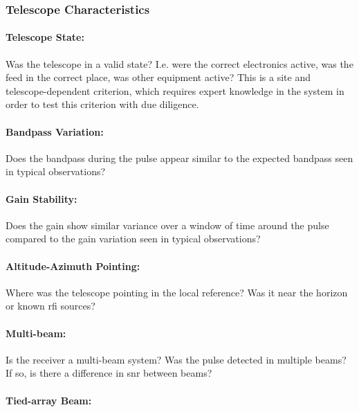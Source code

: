 \documentclass[a4paper,fleqn,usenatbib]{mnras}
\begin{document}
\subsubsection{Telescope Characteristics}

\paragraph{Telescope State:}

Was the telescope in a valid state? I.e. were the correct electronics active,
was the feed in the correct place, was other equipment active? This is a site
and telescope-dependent criterion, which requires expert knowledge in the
system in order to test this criterion with due diligence.

\paragraph{Bandpass Variation:}

Does the bandpass during the pulse appear similar to the expected bandpass seen in
typical observations?

\paragraph{Gain Stability:}

Does the gain show similar variance over a window of time around the pulse
compared to the gain variation seen in typical observations?

\paragraph{Altitude-Azimuth Pointing:}

Where was the telescope pointing in the local reference? Was it near the horizon
or known \gls{rfi} sources?

\paragraph{Multi-beam:}

Is the receiver a multi-beam system? Was the pulse detected in multiple beams?
If so, is there a difference in \gls{snr} between beams?

\paragraph{Tied-array Beam:}
\end{document}
